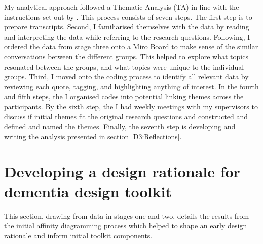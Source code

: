 My analytical approach followed a Thematic Analysis (TA) in line with the instructions set out by  \cite{braun_using_2006,braun_one_2020}. This process consists of seven steps. The first step is to prepare transcripts. Second,  I familiarised themselves with the data by reading and interpreting the data while referring to the research questions. Following, I ordered the data from stage three onto a Miro Board to make sense of the similar conversations between the different groups. This helped to explore what topics resonated between the groups, and what topics were unique to the individual groups. Third, I moved onto the coding process to identify all relevant data by reviewing each quote, tagging, and highlighting anything of interest. In the fourth and fifth steps, the I organised codes into potential linking themes across the participants. By the sixth step, the I had weekly meetings with my supervisors to discuss if initial themes fit the original research questions and constructed and defined and named the themes. Finally, the seventh step is developing and writing the analysis presented in section \ref{D3:Reflections}.

\section{Developing a design rationale for dementia design toolkit}
\label{D3:Rationale}
This section, drawing from data in stages one and two, details the results from the initial affinity diagramming process which helped to shape an early design rationale and inform initial toolkit components.

